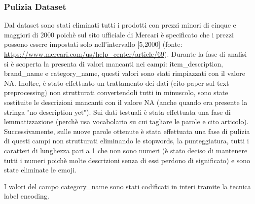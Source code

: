 \subsubsection{Pulizia Dataset}
Dal dataset sono stati eliminati tutti i prodotti con prezzi minori di cinque e maggiori di 2000 poichè sul sito ufficiale di Mercari è specificato che i prezzi possono essere impostati solo nell'intervallo [5,2000] (fonte: \url{https://www.mercari.com/us/help_center/article/69}).
Durante la fase di analisi si è scoperta la presenta di valori mancanti nei campi: item\_description, brand\_name e category\_name, questi valori sono stati rimpiazzati con il valore NA.
Inoltre, è stato effettuato un trattamento dei dati (cito paper sul text preprocessing) non strutturati convertendoli tutti in minuscolo, sono state sostituite le descrizioni mancanti con il valore NA (anche quando era presente la stringa "no description yet").
Sui dati testuali è stata effettuata una fase di lemmatizzazione (perchè usa vocabolario su cui tagliare le parole e cito articolo). Successivamente, sulle nuove parole ottenute è stata effettuata una fase di pulizia di questi campi non strutturati eliminando le stopwords, la punteggiatura, tutti i caratteri di lunghezza pari a 1 che non sono numeri (è stato deciso di mantenere tutti i numeri poichè molte descrizioni senza di essi perdono di significato) e sono state eliminate le emoji.


I valori del campo category\_name sono stati codificati in interi tramite la tecnica label encoding.

